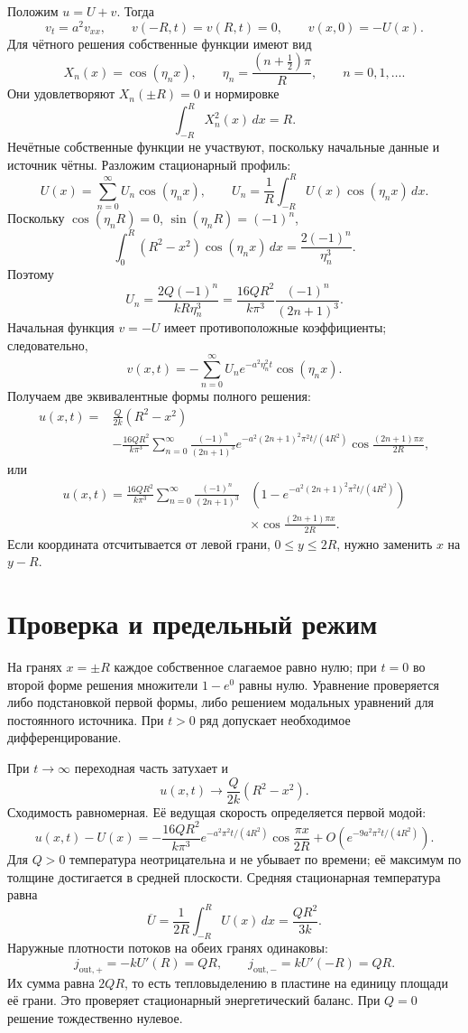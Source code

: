 Положим $u=U+v$. Тогда
\[
 v_t=a^2v_{xx},\qquad v(-R,t)=v(R,t)=0,
 \qquad v(x,0)=-U(x).
\]
Для чётного решения собственные функции имеют вид
\[
 X_n(x)=\cos(\eta_nx),\qquad
 \eta_n=\frac{(n+\tfrac12)\pi}{R},\qquad n=0,1,\ldots.
\]
Они удовлетворяют $X_n(\pm R)=0$ и нормировке
\[
 \int_{-R}^RX_n^2(x)\,dx=R.
\]
Нечётные собственные функции не участвуют, поскольку начальные данные
и источник чётны.
Разложим стационарный профиль:
\[
 U(x)=\sum_{n=0}^{\infty}U_n\cos(\eta_nx),\qquad
 U_n=\frac1R\int_{-R}^RU(x)\cos(\eta_nx)\,dx.
\]
Поскольку $\cos(\eta_nR)=0$, $\sin(\eta_nR)=(-1)^n$,
\[
 \int_0^R(R^2-x^2)\cos(\eta_nx)\,dx
 =\frac{2(-1)^n}{\eta_n^3}.
\]
Поэтому
\[
 \boxed{U_n=\frac{2Q(-1)^n}{kR\eta_n^3}
 =\frac{16QR^2}{k\pi^3}\frac{(-1)^n}{(2n+1)^3}.}
\]
Начальная функция $v=-U$ имеет противоположные коэффициенты;
следовательно,
\[
 v(x,t)=-\sum_{n=0}^{\infty}U_n e^{-a^2\eta_n^2t}\cos(\eta_nx).
\]
Получаем две эквивалентные формы полного решения:
\[
\boxed{\begin{aligned}
 u(x,t)={}&\frac Q{2k}(R^2-x^2)\\
 &-\frac{16QR^2}{k\pi^3}\sum_{n=0}^{\infty}
 \frac{(-1)^n}{(2n+1)^3}
 e^{-a^2(2n+1)^2\pi^2t/(4R^2)}
 \cos\frac{(2n+1)\pi x}{2R},
\end{aligned}}
\]
или
\[
\boxed{\begin{aligned}
 u(x,t)=\frac{16QR^2}{k\pi^3}\sum_{n=0}^{\infty}
 \frac{(-1)^n}{(2n+1)^3}
 &\left(1-e^{-a^2(2n+1)^2\pi^2t/(4R^2)}\right)\\
 &\times\cos\frac{(2n+1)\pi x}{2R}.
\end{aligned}}
\]
Если координата отсчитывается от левой грани, $0\le y\le2R$,
нужно заменить $x$ на $y-R$.

\section{Проверка и предельный режим}

На гранях $x=\pm R$ каждое собственное слагаемое равно нулю;
при $t=0$ во второй форме решения множители $1-e^0$ равны нулю.
Уравнение проверяется либо подстановкой первой формы, либо
решением модальных уравнений для постоянного источника.
При $t>0$ ряд допускает необходимое дифференцирование.

При $t\to\infty$ переходная часть затухает и
\[
\boxed{u(x,t)\longrightarrow\frac Q{2k}(R^2-x^2).}
\]
Сходимость равномерная. Её ведущая скорость определяется первой модой:
\[
 u(x,t)-U(x)=-\frac{16QR^2}{k\pi^3}
 e^{-a^2\pi^2t/(4R^2)}\cos\frac{\pi x}{2R}
 +O\left(e^{-9a^2\pi^2t/(4R^2)}\right).
\]
Для $Q>0$ температура неотрицательна и не убывает по времени;
её максимум по толщине достигается в средней плоскости.
Средняя стационарная температура равна
\[
 \overline U=\frac1{2R}\int_{-R}^RU(x)\,dx=\frac{QR^2}{3k}.
\]
Наружные плотности потоков на обеих гранях одинаковы:
\[
 j_{\mathrm{out},+}=-kU'(R)=QR,\qquad
 j_{\mathrm{out},-}=kU'(-R)=QR.
\]
Их сумма равна $2QR$, то есть тепловыделению в пластине на единицу
площади её грани. Это проверяет стационарный энергетический баланс.
При $Q=0$ решение тождественно нулевое.
